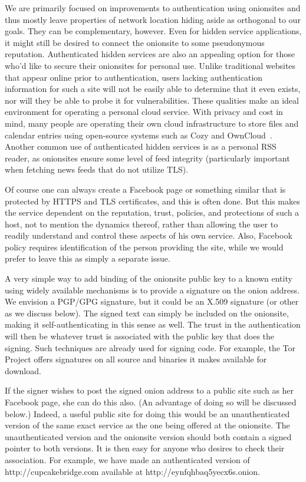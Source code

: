 \documentclass[10pt, conference, compsocconf]{styles/IEEEtran}
\begin{document}
We are primarily focused on improvements to authentication using
onionsites and thus mostly leave properties of network location hiding
aside as orthogonal to our goals. They can be complementary, however.
Even for hidden service applications, it might still be desired to
connect the onionsite to some pseudonymous reputation.  Authenticated
hidden services are also an appealing option for those who'd like to
secure their onionsites for personal use.  Unlike traditional websites
that appear online prior to authentication, users lacking
authentication information for such a site will not be easily able to
determine that it even exists, nor will they be able to probe it for
vulnerabilities.  These qualities make an ideal environment for
operating a personal cloud service.  With privacy and cost in mind,
many people are operating their own cloud infrastructure to store
files and calendar entries using open-source systems such as Cozy and
OwnCloud~\cite{cozy}.  Another common use of authenticated hidden
services is as a personal RSS reader, as onionsites ensure some level
of feed integrity (particularly important when fetching news feeds
that do not utilize TLS).

Of course one can always create a Facebook page or something similar
that is protected by HTTPS and TLS certificates,
and this is often done.  But this makes the service dependent on the
reputation, trust, policies, and protections of such a host, not to mention
the dynamics thereof, rather than allowing the user to readily understand
and control these aspects of his own service. Also, Facebook
policy requires identification of the person providing the site,
while we would prefer to leave this as simply a separate issue.

A very simple way to add binding of the onionsite public key to
a known entity using widely available mechanisms is to provide a
signature on the onion address. We envision a PGP/GPG signature, but
it could be an X.509 signature (or other as we discuss below). 
The signed text can simply be
included on the onionsite, making it self-authenticating in this sense
as well. The trust in the authentication will then be whatever trust
is associated with the public key that does the signing. Such
techniques are already used for signing code. For example,
the Tor Project offers signatures on all source and binaries
it makes available for download. 

If the signer wishes to post the signed onion address to a public
site such as her Facebook page, she can do this also. (An advantage
of doing so will be discussed below.) Indeed, a
useful public site for doing this would be an unauthenticated version
of the same exact service as the one being offered at the onionsite.
The unauthenticated version and the onionsite version should both
contain a signed pointer to both versions. It is then
easy for anyone who desires to check their association.
For example, we have made an authenticated version of
http://cupcakebridge.com available at http://eynfqhbaq5yecx6s.onion.
\end{document}
